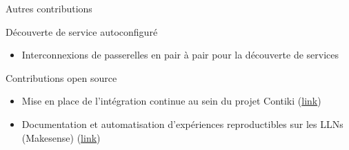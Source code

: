 \begin{frame}{Autres contributions}
  
  \begin{block}{Découverte de service autoconfiguré}
    \begin{itemize}
      \item Interconnexions de passerelles en pair à pair pour la découverte de services
    \end{itemize}
  \end{block}

  \begin{block}{Contributions open source}
    \begin{itemize}
      \item Mise en place de l'intégration continue au sein du projet Contiki (\href{https://contiki-os.blogspot.fr/2012/12/contiki-regression-tests-9-hardware.html}{link})
      \item Documentation et automatisation d'expériences reproductibles sur les LLNs (Makesense) (\href{https://github.com/sieben/makesense}{link})
    \end{itemize}
  \end{block}






\end{frame}


